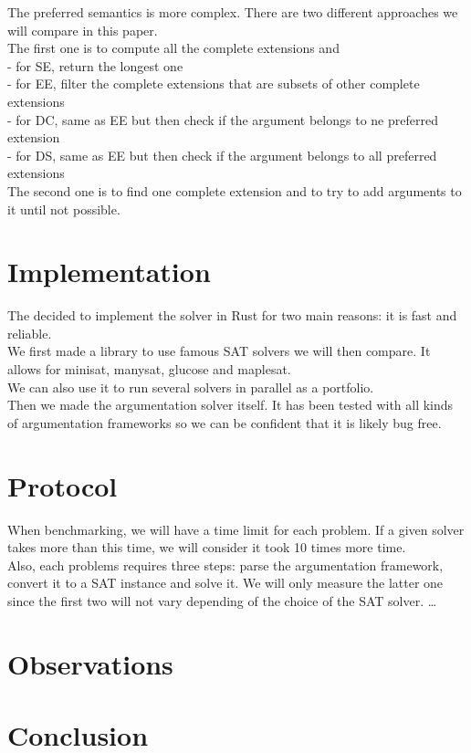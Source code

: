 \documentclass[11pt]{article}
\begin{document}
The preferred semantics is more complex. There are two different approaches we will compare in this paper. \\
The first one is to compute all the complete extensions and \\
 - for SE, return the longest one \\
 - for EE, filter the complete extensions that are subsets of other complete extensions \\
 - for DC, same as EE but then check if the argument belongs to ne preferred extension \\
 - for DS, same as EE but then check if the argument belongs to all preferred extensions \\
The second one is to find one complete extension and to try to add arguments to it until not possible.

\section{Implementation}

The decided to implement the solver in Rust for two main reasons: it is fast and reliable. \\
We first made a library\cite{portfoliolib} to use famous SAT solvers we will then compare. It allows for minisat, manysat, glucose and maplesat. \\
We can also use it to run several solvers in parallel as a portfolio. \\
Then we made the argumentation solver itself\cite{argsolver}. It has been tested with all kinds of argumentation frameworks so we can be confident that it is likely bug free.


\section{Protocol}
When benchmarking, we will have a time limit for each problem. If a given solver takes more than this time, we will consider it took 10 times more time. \\
Also, each problems requires three steps: parse the argumentation framework, convert it to a SAT instance and solve it. We will only measure the latter one since the first two will not vary depending of the choice of the SAT solver.
\dots

\section{Observations}

\section{Conclusion}



\end{document}
